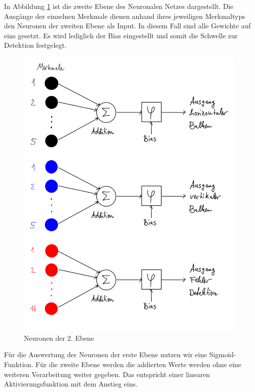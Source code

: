In Abbildung \ref{Neurin2Ebene} ist die zweite Ebene des Neuronalen Netzes dargestellt. Die Ausgänge der einzelnen Merkmale dienen anhand ihres jeweiligen Merkmaltyps den Neuronen der zweiten Ebene als Input. In diesem Fall sind alle Gewichte auf eins gesetzt. Es wird lediglich der Bias eingestellt und somit die Schwelle zur Detektion festgelegt. 

\begin{figure}[hbt]
	\centering
	\includegraphics[width=0.8\linewidth]{./Bilder/Auswertung/Aufbau/page7}
	\caption{Neuronen der 2. Ebene}
	\label{Neurin2Ebene}
\end{figure}

Für die Auswertung der Neuronen der erste Ebene nutzen wir eine Sigmoid-Funktion. Für die zweite Ebene werden die addierten Werte werden ohne eine weiteren Verarbeitung weiter gegeben. Das entspricht einer linearen Aktivierungsfunktion mit dem Anstieg eins.
